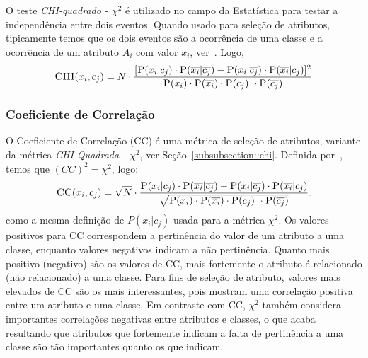 O teste \textit{CHI-quadrado - $\chi^2$} é utilizado no campo da Estatística para testar a independência entre dois eventos. Quando usado para seleção de atributos, tipicamente temos que os dois eventos são a ocorrência de uma classe e a ocorrência de um atributo $A_i$ com valor $x_i$, ver~\cite{Zheng03}. Logo,
\begin{equation}\label{eqn::chi}
  \textsc{CHI}(x_i, c_j) = N \cdot \frac{ [ \textsc{P}(x_i|c_j) \cdot \textsc{P}(\overline{x_i}|\overline{c_j}) - \textsc{P}(x_i|\overline{c_j}) \cdot \textsc{P}(\overline{x_i}|c_j) ]^2 } {\textsc{P}(x_i) \cdot \textsc{P}(\overline{x_i}) \cdot \textsc{P}(c_j) \ \cdot \textsc{P}(\overline{c_j}) }
\end{equation}

\subsubsection{Coeficiente de Correlação}
\label{subsubsection::cc}

O Coeficiente de Correlação (CC) é uma métrica de seleção de atributos, variante da métrica \textit{CHI-Quadrada - $\chi^2$}, ver Seção~\ref{subsubsection::chi}. Definida por~\cite{Ng97}, temos que $(CC)^2 = \chi^2$, logo:
\begin{equation}\label{eqn::ce}
   \textsc{CC}(x_i, c_j) = \sqrt{N} \cdot \frac{ \textsc{P}(x_i|c_j) \cdot \textsc{P}(\overline{x_i}|\overline{c_j}) - \textsc{P}(x_i|\overline{c_j}) \cdot \textsc{P}(\overline{x_i}|c_j) } {\sqrt{ \textsc{P}(x_i) \cdot \textsc{P}(\overline{x_i}) \cdot \textsc{P}(c_j) \ \cdot \textsc{P}(\overline{c_j}) } }.
\end{equation}
como a mesma definição de $P(x_i|c_j)$ usada para a métrica $\chi^2$. Os valores positivos para CC correspondem a pertinência do valor de um atributo a uma classe, enquanto valores negativos indicam a não pertinência. Quanto mais positivo (negativo) são os valores de CC, mais fortemente o atributo é relacionado (não relacionado) a uma classe. Para fins de seleção de atributo, valores mais elevados de CC são os mais interessantes, pois mostram uma correlação positiva entre um atributo e uma classe. Em contraste com CC, $\chi^2$ também considera importantes correlações negativas entre atributos e classes, o que acaba resultando que atributos que fortemente indicam a falta de pertinência a uma classe são tão importantes quanto os que indicam.


